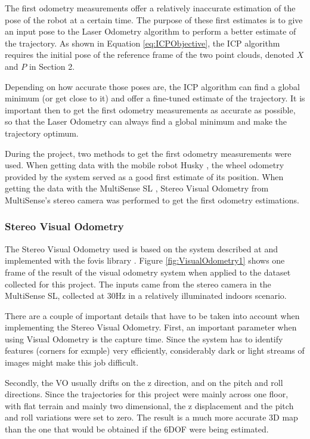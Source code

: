 \documentclass[12pt]{article}
\begin{document}
The first odometry measurements offer a relatively inaccurate estimation of the pose of the robot at a certain time. The purpose of these first estimates is to give an input pose to the Laser Odometry algorithm to perform a better estimate of the trajectory. As shown in Equation \ref{eq:ICPObjective}, the ICP algorithm requires the initial pose of the reference frame of the two point clouds, denoted $X$ and $P$ in Section 2.

Depending on how accurate those poses are, the ICP algorithm can find a global minimum (or get close to it) and offer a fine-tuned estimate of the trajectory. It is important then to get the first odometry measurements as accurate as possible, so that the Laser Odometry can always find a global minimum and make the trajectory optimum.
	
During the project, two methods to get the first odometry measurements were used. When getting data with the mobile robot Husky \cite{Husky}, the wheel odometry provided by the system served as a good first estimate of its position. When getting the data with the MultiSense SL \cite{multisense}, Stereo Visual Odometry from MultiSense's stereo camera was performed to get the first odometry estimations.
	
	\subsubsection*{Stereo Visual Odometry}

The Stereo Visual Odometry used is based on the system described at \cite{VisualOdometry} and implemented with the fovis library \cite{fovis}. Figure \ref{fig:VisualOdometry1} shows one frame of the result of the visual odometry system when applied to the dataset collected for this project. The inputs came from the stereo camera in the MultiSense SL, collected at 30Hz in a relatively illuminated indoors scenario.
	
There are a couple of important details that have to be taken into account when implementing the Stereo Visual Odometry. First, an important parameter when using Visual Odometry is the capture time. Since the system has to identify features (corners for exmple) very efficiently, considerably dark or light streams of images might make this job difficult.  
	
Secondly, the VO usually drifts on the z direction, and on the pitch and roll directions. Since the trajectories for this project were mainly across one floor, with flat terrain and mainly two dimensional, the z displacement and the pitch and roll variations were set to zero. The result is a much more accurate 3D map than the one that would be obtained if the 6DOF were being estimated.
	
\end{document}
